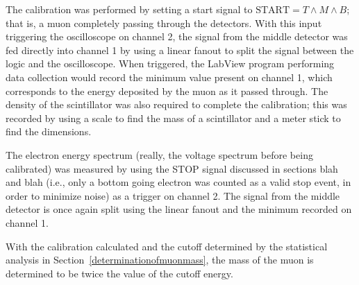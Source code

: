 The calibration was performed by setting a start signal to $\mathrm{START} = T \wedge M \wedge B$; that is, a muon completely passing through the detectors. With this input triggering the oscilloscope on channel 2, the signal from the middle detector was fed directly into channel 1 by using a linear fanout to split the signal between the logic and the oscilloscope. When triggered, the LabView program performing data collection would record the minimum value present on channel 1, which corresponds to the energy deposited by the muon as it passed through. The density of the scintillator was also required to complete the calibration; this was recorded by using a scale to find the mass of a scintillator and a meter stick to find the dimensions.

The electron energy spectrum (really, the voltage spectrum before being calibrated) was measured by using the STOP signal discussed in sections blah and blah (i.e., only a bottom going electron was counted as a valid stop event, in order to minimize noise) as a trigger on channel 2. The signal from the middle detector is once again split using the linear fanout and the minimum recorded on channel 1. 

With the calibration calculated and the cutoff determined by the statistical analysis in Section~\ref{determinationofmuonmass}, the mass of the muon is determined to be twice the value of the cutoff energy.